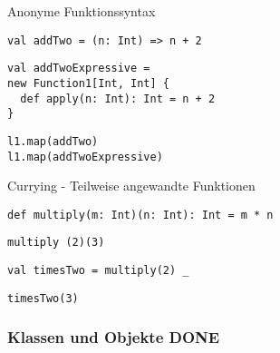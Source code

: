 \documentclass[14pt,aspectratio=169,trans]{beamer} %
\begin{document}
    

\begin{frame}[fragile]{}
	\begin{block}{Anonyme Funktionssyntax}
		\scriptsize
		\onslide<2->
  \begin{lstlisting}[firstnumber=1]
val addTwo = (n: Int) => n + 2
	\end{lstlisting}
	
  \begin{lstlisting}[firstnumber=2]
val addTwoExpressive =
new Function1[Int, Int] {
  def apply(n: Int): Int = n + 2
}
	\end{lstlisting}
  \begin{lstlisting}[firstnumber=6]
l1.map(addTwo)
l1.map(addTwoExpressive)
	\end{lstlisting}

	\end{block}
	\note{}
\end{frame}

\begin{frame}[fragile]{}
	\begin{block}{Currying - Teilweise angewandte Funktionen}
		\scriptsize
		\onslide<2->
  \begin{lstlisting}[firstnumber=1]
def multiply(m: Int)(n: Int): Int = m * n
	\end{lstlisting}
  \begin{lstlisting}[firstnumber=2]
multiply (2)(3)
	\end{lstlisting}
  \begin{lstlisting}[firstnumber=3]
val timesTwo = multiply(2) _
	\end{lstlisting}
  \begin{lstlisting}[firstnumber=4]
timesTwo(3)
	\end{lstlisting}
	\end{block}

\end{frame}

\subsubsection*{Klassen und Objekte DONE}
\end{document}
